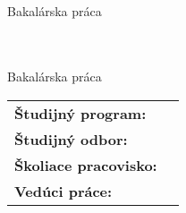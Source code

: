 \newcommand{\coverTop}{
    \begin{center}
        {\textbf \Large \textsc {\settingsSchool \\ \settingsFaculty}}
        \vfill
        {\LARGE \em \settingsTitle}
        \\
        \medskip
        {\large Bakalárska práca}
    \end{center}
}

\newcommand{\coverCenter}{
    \begin{tabular}{l l}
        \textbf{Študijný program:} & \settingsProgramme \\
        \textbf{Študijný odbor:} & \settingsField \\
        \textbf{Školiace pracovisko:} & \settingsDepartment \\
        \textbf{Vedúci práce:} &  \settingsAdvisor
    \end{tabular}
}

\newcommand{\coverBottom}{
    \begin{center}
        \textbf{\settingsYear \hfill \settingsAuthor}
    \end{center}
}

\thispagestyle{empty}
\coverTop
\vfill
\coverBottom
\newpage

\thispagestyle{empty}
\coverTop
\vfill
\coverCenter
\vfill
\coverBottom
\newpage

